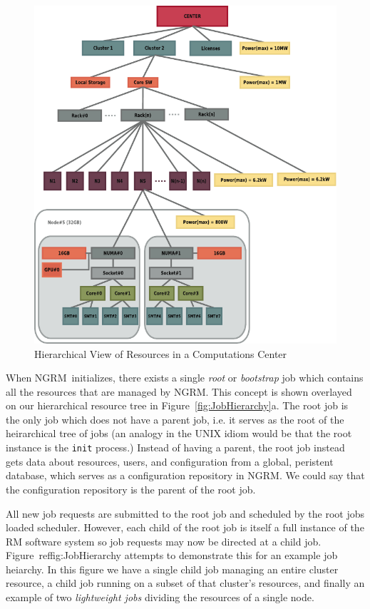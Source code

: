 \documentclass{article}
\newcommand{\ngrm}{NGRM}
\begin{document}
\begin{figure}
\centering
\includegraphics[scale=0.75]{resource-hierarchy}
\caption{Hierarchical View of Resources in a Computations Center}
\label{fig:ResHierarchy}
\end{figure}

When \ngrm\ initializes, there exists a single {\em root} or {\em
bootstrap} job which contains all the resources that are managed by
\ngrm. This concept is shown overlayed on our hierarchical resource
tree in Figure~\ref{fig:JobHierarchy}a. The root job is the only job
which does not have a parent job, i.e. it serves as the root of
the heirarchical tree of jobs (an analogy in the UNIX idiom would
be that the root instance is the {\tt init} process.) Instead of
having a parent, the root job instead gets data about resources,
users, and configuration from a global, peristent database, which
serves as a configuration repository in \ngrm. We could say that
the configuration repository is the parent of the root job.

All new job requests are submitted to the root job and scheduled
by the root jobs loaded scheduler. However, each child of the
root job is itself a full instance of the RM software system
so job requests may now be directed at a child job.
Figure~ref{fig:JobHierarchy} attempts to demonstrate this for
an example job heiarchy. In this figure we have a single child
job managing an entire cluster resource, a child job running
on a subset of that cluster's resources, and finally an example
of two {\em lightweight jobs} dividing the resources of a
single node.
\end{document}
